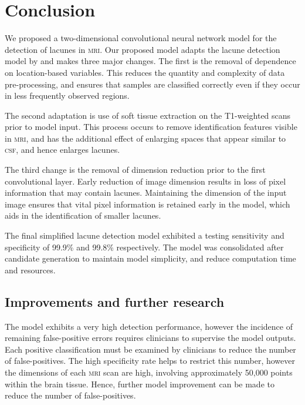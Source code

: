 %
%

\chapter{Conclusion}\label{conclusion}


We proposed a two-dimensional convolutional neural network model for the detection of lacunes in \textsc{mri}. Our proposed model adapts the lacune detection model by \cite{GhafoorianM.2017Dml3} and makes three major changes. The first is the removal of dependence on location-based variables. This reduces the quantity and complexity of data pre-processing, and ensures that samples are classified correctly even if they occur in less frequently observed regions.

The second adaptation is use of soft tissue extraction on the T1-weighted scans prior to model input. This process occurs to remove identification features visible in \textsc{mri}, and has the additional effect of enlarging spaces that appear similar to \textsc{csf}, and hence enlarges lacunes.

The third change is the removal of dimension reduction prior to the first convolutional layer. Early reduction of image dimension results in loss of pixel information that may contain lacunes. Maintaining the dimension of the input image ensures that vital pixel information is retained early in the model, which aids in the identification of smaller lacunes.

The final simplified lacune detection model exhibited a testing sensitivity and specificity of 99.9\% and 99.8\% respectively. The model was consolidated after candidate generation to maintain model simplicity, and reduce computation time and resources. 

\section{Improvements and further research}

The model exhibits a very high detection performance, however the incidence of remaining false-positive errors requires clinicians to supervise the model outputs. Each positive classification must be examined by clinicians to reduce the number of false-positives. The high specificity rate helps to restrict this number, however the dimensions of each \textsc{mri} scan are high, involving approximately 50,000 points within the brain tissue. Hence, further model improvement can be made to reduce the number of false-positives.

